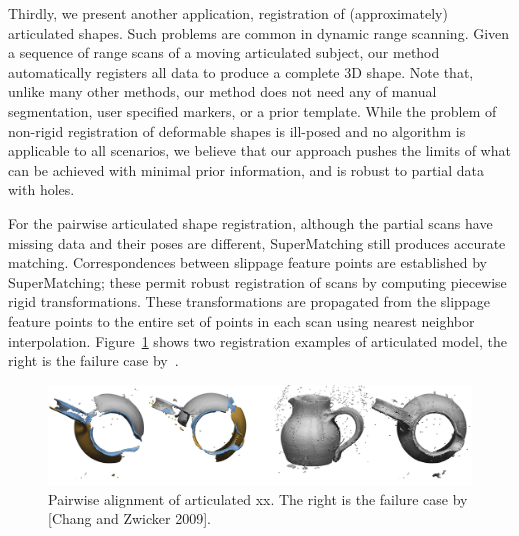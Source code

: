 Thirdly, we present another application, registration of (approximately) articulated shapes. Such problems are common in dynamic range scanning.
Given a sequence of range scans of a moving articulated subject, our method automatically registers all data to produce a complete 3D shape.
Note that, unlike many other methods, our method does not need any of manual segmentation, user specified markers, or a prior template.
While the problem of non-rigid registration of deformable shapes is ill-posed and no algorithm is applicable to all scenarios,
we believe that our approach pushes the limits of what can be achieved with minimal prior information, and is robust to partial data with holes.

For the pairwise articulated shape registration, 
although the partial scans have missing data and their poses are different, SuperMatching still produces accurate matching.
Correspondences between slippage feature points are established by SuperMatching; 
these permit robust registration of scans by computing piecewise rigid transformations.
These transformations are propagated from the slippage feature points to the entire set of points in each scan using nearest neighbor interpolation.
Figure~\ref{fig:3DRobot} shows two registration examples of articulated model, the right is the failure case by~\cite{Chang09}.

\begin{figure}[h]
\centering
  \includegraphics[width=0.99\linewidth]{figures/rigidCMP.jpg}
  \caption{Pairwise alignment of articulated xx. The right is the failure case by [Chang and Zwicker 2009]. }
\label{fig:3DRobot}
\end{figure}

